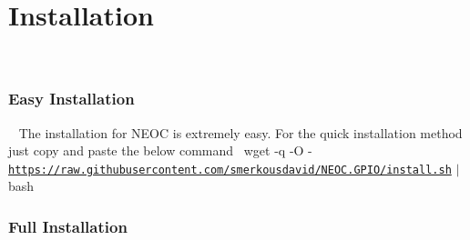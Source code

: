 ~\newline
 \hypertarget{index_install_sec}{}\section{Installation}\label{index_install_sec}
~\newline
\subsubsection*{Easy Installation}

~\newline
 The installation for N\+E\+OC is extremely easy. For the quick installation method just copy and paste the below command~\newline
 {\ttfamily wget -\/q -\/O -\/ \href{https://raw.githubusercontent.com/smerkousdavid/NEOC.GPIO/install.sh}{\tt https\+://raw.\+githubusercontent.\+com/smerkousdavid/\+N\+E\+O\+C.\+G\+P\+I\+O/install.\+sh} $\vert$ bash}~\newline
 \subsubsection*{Full Installation}

